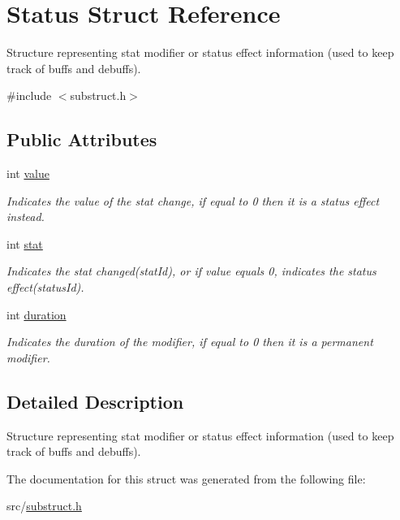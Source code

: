 \hypertarget{struct_status}{}\section{Status Struct Reference}
\label{struct_status}


Structure representing stat modifier or status effect information (used to keep track of buffs and debuffs).  




{\ttfamily \#include $<$substruct.\+h$>$}

\subsection*{Public Attributes}
\begin{DoxyCompactItemize}
\item 
\mbox{\label{struct_status_a5d07d0a3322e06260954630a35a701ec}} 
int \hyperlink{struct_status_a5d07d0a3322e06260954630a35a701ec}{value}
\begin{DoxyCompactList}\small\item\em Indicates the value of the stat change, if equal to 0 then it is a status effect instead. \end{DoxyCompactList}\item 
\mbox{\label{struct_status_ac40f96a86d3bdae29c68c65c1c54c345}} 
int \hyperlink{struct_status_ac40f96a86d3bdae29c68c65c1c54c345}{stat}
\begin{DoxyCompactList}\small\item\em Indicates the stat changed(stat\+Id), or if value equals 0, indicates the status effect(status\+Id). \end{DoxyCompactList}\item 
\mbox{\label{struct_status_ab4e1dae6d047dddced8dc3523a3fa916}} 
int \hyperlink{struct_status_ab4e1dae6d047dddced8dc3523a3fa916}{duration}
\begin{DoxyCompactList}\small\item\em Indicates the duration of the modifier, if equal to 0 then it is a permanent modifier. \end{DoxyCompactList}\end{DoxyCompactItemize}


\subsection{Detailed Description}
Structure representing stat modifier or status effect information (used to keep track of buffs and debuffs). 

The documentation for this struct was generated from the following file\+:\begin{DoxyCompactItemize}
\item 
src/\hyperlink{substruct_8h}{substruct.\+h}\end{DoxyCompactItemize}
